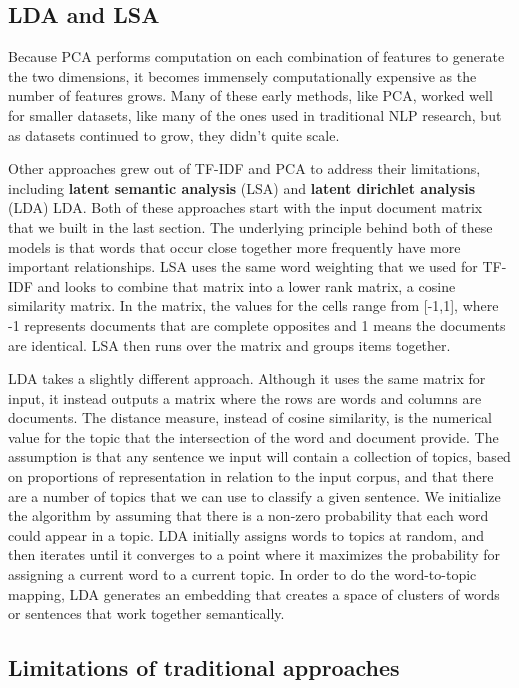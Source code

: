 \documentclass[11pt, table]{diazessay} %
\begin{document}
\begin{sloppypar}
\subsection{LDA and LSA}

Because PCA performs computation on each combination of features to generate the two dimensions, it becomes immensely computationally expensive as the number of features grows.  Many of these early methods, like PCA, worked well for smaller datasets, like many of the ones used in traditional NLP research,  but as datasets continued to grow, they didn’t quite scale.  

Other approaches grew out of TF-IDF and PCA to address their limitations, including \textbf{latent semantic analysis} (LSA) and \textbf{latent dirichlet analysis} (LDA) LDA\cite{cvitanic2016lda}.  Both of these approaches start with the input document matrix that we built in the last section. The underlying principle behind both of these models is that words that occur close together more frequently have more important relationships. LSA uses the same word weighting that we used for TF-IDF and looks to combine that matrix into a lower rank matrix, a cosine similarity matrix. In the matrix, the values for the cells range from [-1,1], where -1 represents documents that are complete opposites and 1 means the documents are identical. LSA then runs over the matrix and groups items together.  

LDA takes a slightly different approach. Although it uses the same matrix for input, it instead outputs a matrix where the rows are words and columns are documents. The distance measure, instead of cosine similarity, is the numerical value for the topic that the intersection of the word and document provide.  The assumption is that any sentence we input will contain a collection of topics, based on proportions of representation in relation to the input corpus, and that there are a number of topics that we can use to classify a given sentence. We initialize the algorithm by assuming that there is a non-zero probability that each word could appear in a topic. LDA initially assigns words to topics at random, and then iterates until it converges to a point where it maximizes the probability for assigning a current word to a current topic.  In order to do the word-to-topic mapping, LDA generates an embedding that creates a space of clusters of words or sentences that work together semantically.

\subsection{Limitations of traditional approaches}
 

\end{sloppypar}
\end{document}
